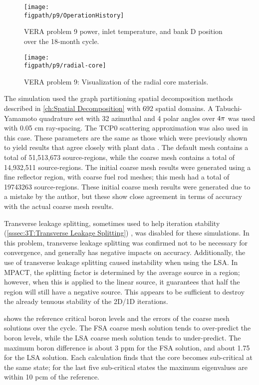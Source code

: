 {{{      \begin{figure}[h]
        \centering
        \texttt{[image: \\figpath/p9/OperationHistory]}
        \caption{VERA problem 9 power, inlet temperature, and bank D position over the 18-month cycle. \label{fig:LSMOC:P9:Operation}}
      \end{figure}

      \begin{figure}[h]
        \centering
        \texttt{[image: \\figpath/p9/radial-core]}
        \caption{VERA problem 9: Visualization of the radial core materials. \label{fig:LSMOC:P9:Radial Core}}
      \end{figure}

      The simulation used the graph partitioning spatial decomposition methods described in \cref{ch:Spatial Decomposition} with 692 spatial domains.
      A Tabuchi-Yamamoto quadrature set with 32 azimuthal and 4 polar angles over $4\pi$ was used with 0.05 cm ray-spacing.
      The TCP0 scattering approximation was also used in this case.
      These parameters are the same as those which were previously shown to yield results that agree closely with plant data \cite{VERA}.
      The default mesh contains a total of 51,513,673 source-regions, while the coarse mesh contains a total of 14,932,511 source-regions. %
      The initial coarse mesh results were generated using a fine reflector region, with coarse fuel rod meshes; this mesh had a total of 19743263 source-regions.
      These initial coarse mesh results were generated due to a mistake by the author, but these show close agreement in terms of accuracy with the actual coarse mesh results.

      Transverse leakage splitting, sometimes used to help iteration stability (\cref{sssec:3T:Transverse Leakage Splitting}) \cite{Stimpson2015,Kelley2015}, was disabled for these simulations.
      In this problem, transverse leakage splitting was confirmed not to be necessary for convergence, and generally has negative impacts on accuracy.
      Additionally, the use of transverse leakage splitting caused instability when using the \ac{LSA}.
      In MPACT, the splitting factor is determined by the average source in a region; however, when this is applied to the linear source, it guarantees that half the region will still have a negative source.
      This appears to be sufficient to destroy the already tenuous stability of the 2D/1D iterations.

       shows the reference critical boron levels and the errors of the coarse mesh solutions over the cycle.
      The \ac{FSA} coarse mesh solution tends to over-predict the boron levels, while the \ac{LSA} coarse mesh solution tends to under-predict.
      The maximum boron difference is about 3 ppm for the \ac{FSA} solution, and about 1.75 for the \ac{LSA} solution.
      Each calculation finds that the core becomes sub-critical at the same state; for the last five sub-critical states the maximum eigenvalues are within 10 pcm of the reference.

}}}
